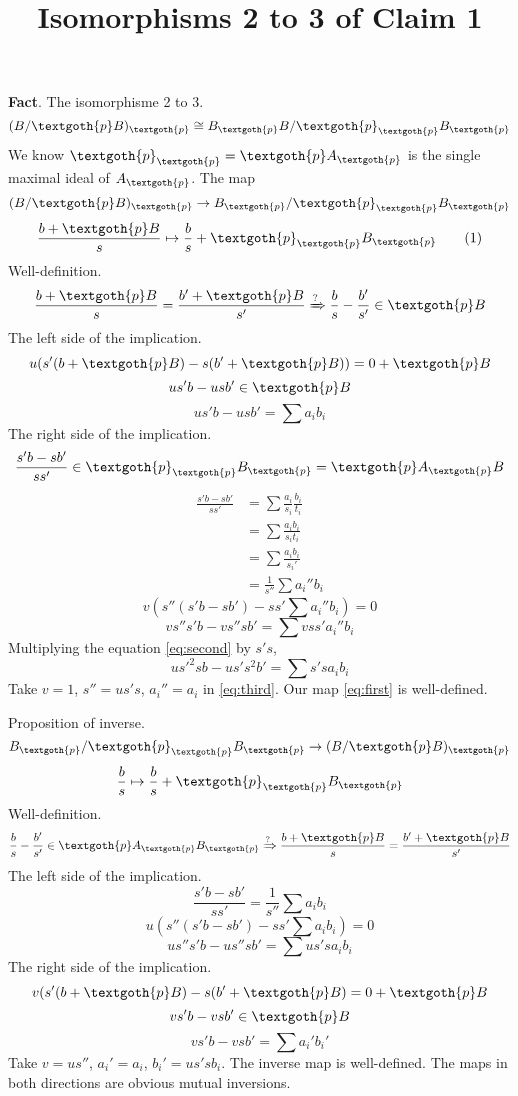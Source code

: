 \documentclass{article}
\title{Isomorphisms 2 to 3 of Claim 1}
\begin{document}
\maketitle

\textbf{Fact}. The isomorphisme 2 to 3.
\[
  (B/\textgoth{p}B)_\textgoth{p} \cong B_\textgoth{p}B / \textgoth{p}_\textgoth{p} B_\textgoth{p}
\]
We know $\textgoth{p}_\textgoth{p} = \textgoth{p}A_\textgoth{p}$ is the single maximal ideal of $A_\textgoth{p}$. The map
\[
(B/\textgoth{p}B)_\textgoth{p} \rightarrow B_\textgoth{p}/\textgoth{p}_\textgoth{p}B_\textgoth{p}
\]
\[
\frac{b + \textgoth{p}B}{s} \mapsto \frac{b}{s} + \textgoth{p}_\textgoth{p}B_\textgoth{p}
\tag{1}\label{eq:first}
\]
Well-definition.
\[
\frac{b + \textgoth{p}B}{s} = \frac{b' + \textgoth{p}B}{s'}
\xRightarrow{?}
\frac{b}{s} - \frac{b'}{s'} \in \textgoth{p}B
\]
The left side of the implication.
\[
u(s'(b + \textgoth{p}B) - s(b' + \textgoth{p}B)) = 0 + \textgoth{p}B
\]
\[
us'b - usb' \in \textgoth{p}B
\]
\[
us'b - usb' = \sum a_i b_i
\tag{2}\label{eq:second}
\]
The right side of the implication.
\[
\frac{s'b - sb'}{ss'} \in \textgoth{p}_\textgoth{p}B_\textgoth{p} = \textgoth{p}A_\textgoth{p}B
\]
\begin{align*}
\frac{s'b - sb'}{ss'} & = \sum \frac{a_i}{s_i}\frac{b_i}{t_i} \\
& = \sum \frac{a_ib_i}{s_it_i} \\
& = \sum \frac{a_ib_i}{s_i'} \\
& = \frac{1}{s''} \sum a_i''b_i
\tag{3}\label{eq:third}
\end{align*}
\[
v(s''(s'b - sb') - ss' \sum a_i'' b_i) = 0
\]
\[
vs''s'b - vs''sb' = \sum vss'a_i''b_i
\]
Multiplying the equation \eqref{eq:second} by $s's$,
\[
us'^2sb - us's^2b' = \sum s'sa_ib_i
\]
Take $v = 1$, $s'' = u s's$, $a_i'' = a_i$ in \eqref{eq:third}. Our map \eqref{eq:first} is well-defined.

\vspace{4mm}
Proposition of inverse.
\[
B_\textgoth{p}/\textgoth{p}_\textgoth{p}B_\textgoth{p} \rightarrow (B/\textgoth{p}B)_\textgoth{p}
\]
\[
\frac{b}{s} \mapsto \frac{b}{s} + \textgoth{p}_\textgoth{p}B_\textgoth{p} 
\]
Well-definition.
\[
\frac{b}{s} - \frac{b'}{s'} \in \textgoth{p}A_\textgoth{p}B_\textgoth{p}
\xRightarrow{?}
\frac{b + \textgoth{p}B}{s} = \frac{b' + \textgoth{p}B}{s'}
\]
The left side of the implication.
\[
\frac{s'b - sb'}{ss'} = \frac{1}{s''}\sum a_i b_i
\]
\[
u(s''(s'b - sb') - ss' \sum a_ib_i) = 0
\]
\[
us''s'b - us''sb' = \sum us'sa_ib_i
\]
The right side of the implication.
\[
v(s'(b + \textgoth{p}B) - s(b' + \textgoth{p}B) = 0 + \textgoth{p}B
\]
\[
vs'b - vsb' \in \textgoth{p}B
\]
\[
vs'b - vsb' = \sum a_i'b_i'
\]
Take $v = us''$, $a_i' = a_i$, $b_i' = us'sb_i$. The inverse map is well-defined. The maps in both directions are obvious mutual inversions.
\end{document}
